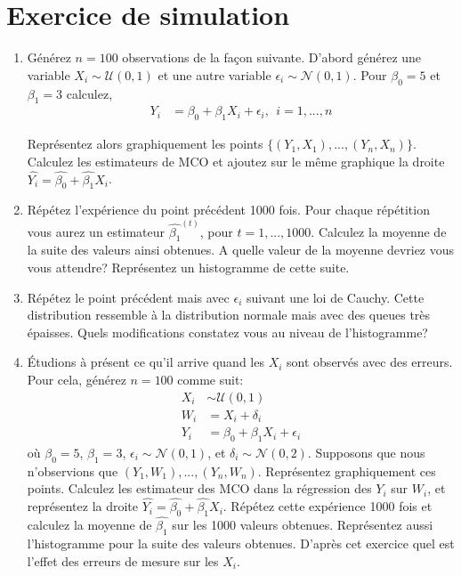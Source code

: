 \section{Exercice de simulation}

\begin{enumerate}
\item Générez $n=100$ observations de la façon suivante. D'abord générez
  une variable $X_i \sim \mathcal{U}(0, 1)$ et une autre variable
  $\epsilon_i\sim \mathcal{N}(0, 1)$. Pour $\beta_0 = 5$ et $\beta_1 =
  3$ calculez,
\begin{align*}
Y_i&= \beta_0 + \beta_1 X_i + \epsilon_i, \ \ i =1,...,n
\end{align*}

Représentez alors graphiquement les points $\{(Y_1,
X_1),...,(Y_n, X_n)\}$. Calculez les estimateurs de MCO et ajoutez sur le
même graphique la droite $\hat{Y_i} = \hat{\beta_0} +
\hat{\beta_1}X_i$.
\item Répétez l'expérience du point précédent 1000 fois. Pour chaque
  répétition vous aurez un estimateur $\hat{\beta_1}^{(t)}$, pour
  $t=1,...,1000$. Calculez la moyenne de la suite des valeurs ainsi
  obtenues. A quelle valeur de la moyenne devriez vous vous attendre?
  Représentez un histogramme de cette suite.
\item Répétez le point précédent mais avec $\epsilon_i$ suivant une
  loi de Cauchy. Cette distribution ressemble à la distribution
  normale mais avec des queues très épaisses. Quels modifications
  constatez vous au niveau de l'histogramme?
\item \'Etudions à présent ce qu'il arrive quand les $X_i$ sont
  observés avec des erreurs. Pour cela, générez $n=100$ comme suit:
\begin{align*}
X_i &\sim \mathcal{U}(0, 1)\\
W_i &= X_i + \delta_i\\
Y_i &= \beta_0 + \beta_1X_i + \epsilon_i
\end{align*}
où $\beta_0 = 5$, $\beta_1=3$, $\epsilon_i \sim\mathcal{N}(0, 1)$, et
$\delta_i \sim \mathcal{N}(0,2)$. Supposons que nous n'observions que
$(Y_1, W_1),...,(Y_n, W_n)$. Représentez graphiquement ces
points. Calculez les estimateur des MCO dans la régression des $Y_i$
sur $W_i$, et représentez la droite $\hat{Y_i} =\hat{\beta_0} +
\hat{\beta_1}X_i$. Répétez cette expérience 1000 fois et calculez la
moyenne de $\hat{\beta_1}$ sur les 1000 valeurs obtenues. Représentez
aussi l'histogramme pour la suite des valeurs obtenues. D'après cet
exercice quel est l'effet des erreurs de mesure sur les $X_i$.  
\end{enumerate}


